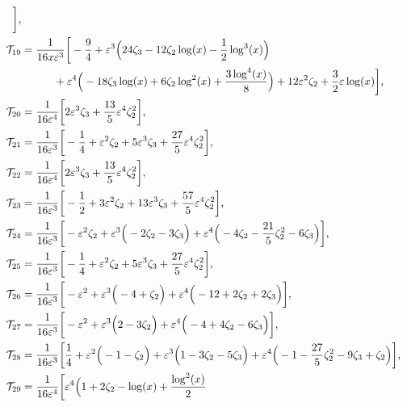 \documentclass[final,1p,times]{elsarticle}
\begin{document}
\begin{align}
% 
\bigg],
% 
\nonumber\\
% 
\mi_{19} &=   \frac{1}{16 x \ep^3}  \bigg[
% 
-\frac{9}{4}
+\ep^3 \Big(
        24 \zeta_3
        -12 \zeta_2 \log (x)
        -\frac{1}{2} \log ^3(x)
\Big)
\nonumber\\& \qquad \quad
+\ep^4 \Big(
        -18 \zeta_3 \log (x)
        +6 \zeta_2 \log ^2(x)
        +\frac{3 \log ^4(x)}{8}
\Big)
+12 \ep^2 \zeta_2
+\frac{3}{2} \ep \log (x)
% 
\bigg],
% 
\nonumber\\
% 
\mi_{20} &=   \frac{1}{16 \ep^4}  \bigg[
% 
2 \ep^3 \zeta_3
+\frac{13}{5} \ep^4 \zeta_2^2
% 
\bigg],
% 
\nonumber\\
% 
\mi_{21} &=   \frac{1}{16 \ep^3}  \bigg[
% 
-\frac{1}{4}
+\ep^2 \zeta_2
+5 \ep^3 \zeta_3
+\frac{27}{5} \ep^4 \zeta_2^2
% 
\bigg],
% 
\nonumber\\
% 
\mi_{22} &=   \frac{1}{16 \ep^4}  \bigg[
% 
2 \ep^3 \zeta_3
+\frac{13}{5} \ep^4 \zeta_2^2
% 
\bigg],
% 
\nonumber\\
% 
\mi_{23} &=   \frac{1}{16 \ep^3}  \bigg[
% 
-\frac{1}{2}
+3 \ep^2 \zeta_2
+13 \ep^3 \zeta_3
+\frac{57}{5} \ep^4 \zeta_2^2
% 
\bigg],
% 
\nonumber\\
% 
\mi_{24} &=   \frac{1}{16 \ep^3}  \bigg[
% 
-\ep^2 \zeta_2
+\ep^3 \Big(
        -2 \zeta_2
        -3 \zeta_3
\Big)
+\ep^4 \Big(
        -4 \zeta_2
        -\frac{21}{5} \zeta_2^2
        -6 \zeta_3
\Big)
\bigg],
% 
\nonumber\\
% 
\mi_{25} &=   \frac{1}{16 \ep^3}  \bigg[
% 
-\frac{1}{4}
+\ep^2 \zeta_2
+5 \ep^3 \zeta_3
+\frac{27}{5} \ep^4 \zeta_2^2
% 
\bigg],
% 
\nonumber\\
% 
\mi_{26} &=   \frac{1}{16 \ep^3}  \bigg[
% 
-\ep^2
+\ep^3 \Big(
        -4
        +\zeta_2
\Big)
+\ep^4 \Big(
        -12
        +2 \zeta_2
        +2 \zeta_3
\Big)
% 
\bigg],
% 
\nonumber\\
% 
\mi_{27} &=   \frac{1}{16 \ep^3}  \bigg[
% 
-\ep^2
+\ep^3 \Big(
        2
        -3 \zeta_2
\Big)
+\ep^4 \Big(
        -4
        +4 \zeta_2
        -6 \zeta_3
\Big)
% 
\bigg],
% 
\nonumber\\
% 
\mi_{28} &=   \frac{1}{16 \ep^3}  \bigg[
% 
\frac{1}{4}
+\ep^2 \Big(
        -1
        -\zeta_2
\Big)
+\ep^3 \Big(
        1
        -3 \zeta_2
        -5 \zeta_3
\Big)
+\ep^4 \Big(
        -1
        -\frac{27}{5} \zeta_2^2
        -9 \zeta_3
        +\zeta_2
\Big)
% 
\bigg],
% 
\nonumber\\
% 
\mi_{29} &=   \frac{1}{16 \ep^4}  \bigg[
% 
\ep^4 \Big(
        1
        +2 \zeta_2
        -\log (x)
        +\frac{\log ^2(x)}{2}

\end{align}
\end{document}
